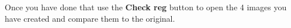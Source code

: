 \documentclass[a4paper,10pt]{article}
\begin{document}
Once you have done that use the \textbf{Check reg} button to open the 4 images you have created and compare them to the original.




\end{document}
